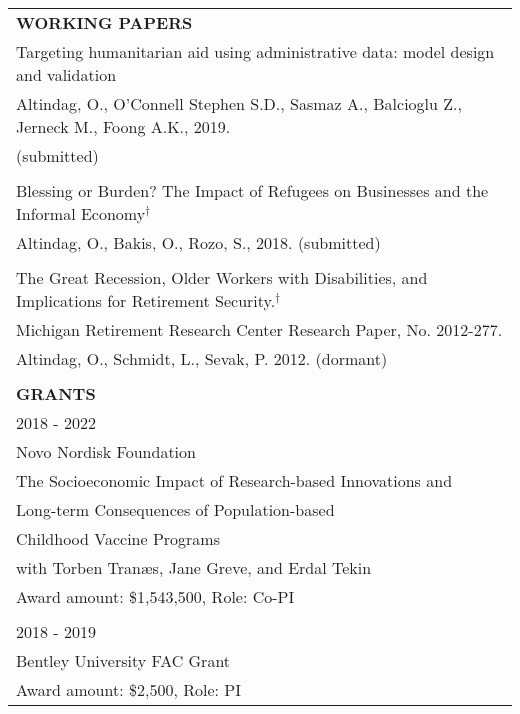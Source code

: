 \documentclass[12 pt]{article}
\begin{document}
\begin{longtable}{ccccc}
\\


\multicolumn{5}{l}{\textbf{WORKING PAPERS}}\\[2 pt]

 \multicolumn{5}{l}{Targeting humanitarian aid using administrative data: model design and validation} \\ 
  \multicolumn{5}{l}{Altindag, O., O'Connell Stephen S.D., Sasmaz A., Balcioglu Z., Jerneck M., Foong A.K., 2019.} \\
\multicolumn{5}{l}{(submitted)} \\ 
 
\\
  \multicolumn{5}{l}{Blessing or Burden? The Impact of Refugees on Businesses and the Informal Economy$^{\dagger}$} \\

  \multicolumn{5}{l}{Altindag, O., Bakis, O., Rozo, S., 2018. (submitted)} \\
  




\\






\multicolumn{5}{l}{The Great Recession, Older Workers with Disabilities, and Implications for Retirement Security.$^{\dagger}$} \\
\multicolumn{5}{l}{Michigan Retirement Research Center Research Paper, No. 2012-277.} \\
\multicolumn{5}{l}{Altindag, O., Schmidt, L., Sevak, P. 2012. (dormant) } \\
\\


  \multicolumn{5}{l}{\textbf{GRANTS}}\\[2 pt]
 \multicolumn{4}{l}{2018 - 2022} \\
 \multicolumn{4}{l}{Novo Nordisk Foundation}  \\
\multicolumn{4}{l}{The Socioeconomic Impact of Research-based Innovations and }  \\
  \multicolumn{4}{l}{Long-term Consequences of Population-based} \\
  \multicolumn{4}{l}{Childhood Vaccine Programs }  \\
  \multicolumn{4}{l}{with Torben Tran{\ae}s, Jane Greve, and Erdal Tekin}  \\
  \multicolumn{4}{l}{Award amount: \$1,543,500, Role: Co-PI  }  \\
  \\
 \multicolumn{4}{l}{2018 - 2019} \\
 \multicolumn{4}{l}{Bentley University FAC Grant} \\
\multicolumn{4}{l}{Award amount: \$2,500, Role: PI}  \\


\end{longtable}
\end{document}
